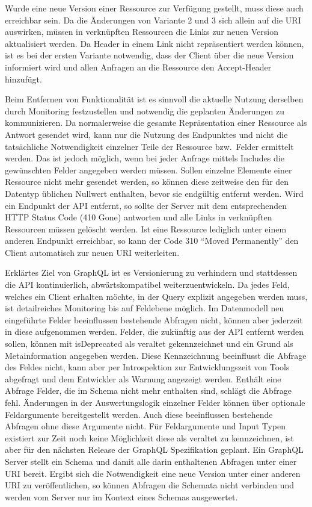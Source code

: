 Wurde eine neue Version einer Ressource zur Verfügung gestellt, muss diese auch erreichbar sein.
Da die Änderungen von Variante 2 und 3 sich allein auf die URI auswirken, müssen in verknüpften Ressourcen die Links zur neuen Version aktualisiert werden.
Da Header in einem Link nicht repräsentiert werden können, ist es bei der ersten Variante notwendig, dass der Client über die neue Version informiert wird und allen Anfragen an die Ressource den Accept-Header hinzufügt.
\par
Beim Entfernen von Funktionalität ist es sinnvoll die aktuelle Nutzung derselben durch Monitoring festzustellen und notwendig die geplanten Änderungen zu kommunizieren.
Da normalerweise die gesamte Repräsentation einer Ressource als Antwort gesendet wird, kann nur die Nutzung des Endpunktes und nicht die tatsächliche Notwendigkeit einzelner Teile der Ressource bzw.\ Felder ermittelt werden.
Das ist jedoch möglich, wenn bei jeder Anfrage mittels Includes die gewünschten Felder angegeben werden müssen.
Sollen einzelne Elemente einer Ressource nicht mehr gesendet werden, so können diese zeitweise den für den Datentyp üblichen Nullwert enthalten, bevor sie endgültig entfernt werden.
Wird ein Endpunkt der API entfernt, so sollte der Server mit dem entsprechenden HTTP Status Code (410 Gone) antworten und alle Links in verknüpften Ressourcen müssen gelöscht werden.
Ist eine Ressource lediglich unter einem anderen Endpunkt erreichbar, so kann der Code 310 \enquote{Moved Permanently} den Client automatisch zur neuen URI weiterleiten.
\par
Erklärtes Ziel von GraphQL ist es Versionierung zu verhindern und stattdessen die API kontinuierlich, abwärtskompatibel weiterzuentwickeln.
Da jedes Feld, welches ein Client erhalten möchte, in der Query explizit angegeben werden muss, ist detailreiches Monitoring bis auf Feldebene möglich.
Im Datenmodell neu eingeführte Felder beeinflussen bestehende Abfragen nicht, können aber jederzeit in diese aufgenommen werden.
Felder, die zukünftig aus der API entfernt werden sollen, können mit isDeprecated als veraltet gekennzeichnet und ein Grund als Metainformation angegeben werden.
Diese Kennzeichnung beeinflusst die Abfrage des Feldes nicht, kann aber per Introspektion zur Entwicklungszeit von Tools abgefragt und dem Entwickler als Warnung angezeigt werden.
Enthält eine Abfrage Felder, die im Schema nicht mehr enthalten sind, schlägt die Abfrage fehl.
Änderungen in der Auswertungslogik einzelner Felder können über optionale Feldargumente bereitgestellt werden.
Auch diese beeinflussen bestehende Abfragen ohne diese Argumente nicht.
Für Feldargumente und Input Typen existiert zur Zeit noch keine Möglichkeit diese als veraltet zu kennzeichnen, ist aber für den nächsten Release der GraphQL Spezifikation geplant.
Ein GraphQL Server stellt ein Schema und damit alle darin enthaltenen Abfragen unter einer URI bereit.
Ergibt sich die Notwendigkeit eine neue Version unter einer anderen URI zu veröffentlichen, so können Abfragen die Schemata nicht verbinden und werden vom Server nur im Kontext eines Schemas ausgewertet.
